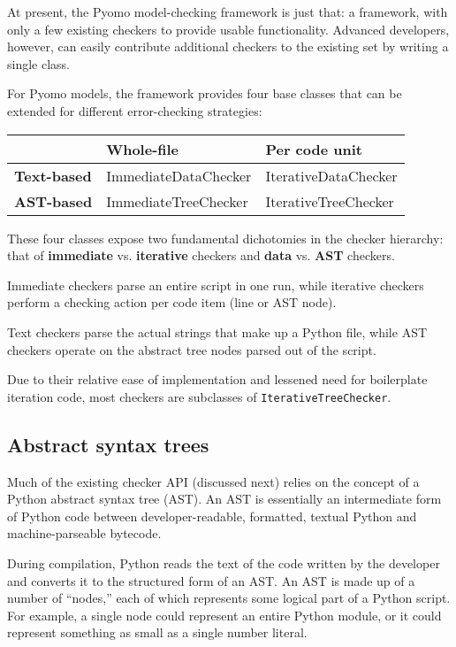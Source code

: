 \documentclass{article}
\begin{document}
At present, the Pyomo model-checking framework is just that: a framework, with only a few existing checkers to provide usable functionality. Advanced developers, however, can easily contribute additional checkers to the existing set by writing a single class.

For Pyomo models, the framework provides four base classes that can be extended for different error-checking strategies:

\begin{tabular}{p{1in} | p{2in} | p{2in}}
& \textbf{Whole-file} & \textbf{Per code unit} \\ \hline
\textbf{Text-based} & ImmediateDataChecker & IterativeDataChecker \\ \hline
\textbf{AST-based} & ImmediateTreeChecker & IterativeTreeChecker
\end{tabular}

\noindent These four classes expose two fundamental dichotomies in the checker hierarchy: that of \textbf{immediate} vs. \textbf{iterative} checkers and \textbf{data} vs. \textbf{AST} checkers. 

\begin{itemize*}
\item Immediate checkers parse an entire script in one run, while iterative checkers perform a checking action per code item (line or AST node).
\item Text checkers parse the actual strings that make up a Python file, while AST checkers operate on the abstract tree nodes parsed out of the script.
\end{itemize*}

Due to their relative ease of implementation and lessened need for boilerplate iteration code, most checkers are subclasses of \verb!IterativeTreeChecker!.

\subsection*{Abstract syntax trees}
Much of the existing checker API (discussed next) relies on the concept of a Python abstract syntax tree (AST). An AST is essentially an intermediate form of Python code between developer-readable, formatted, textual Python and machine-parseable bytecode.

During compilation, Python reads the text of the code written by the developer and converts it to the structured form of an AST. An AST is made up of a number of ``nodes,'' each of which represents some logical part of a Python script. For example, a single node could represent an entire Python module, or it could represent something as small as a single number literal.
\end{document}
